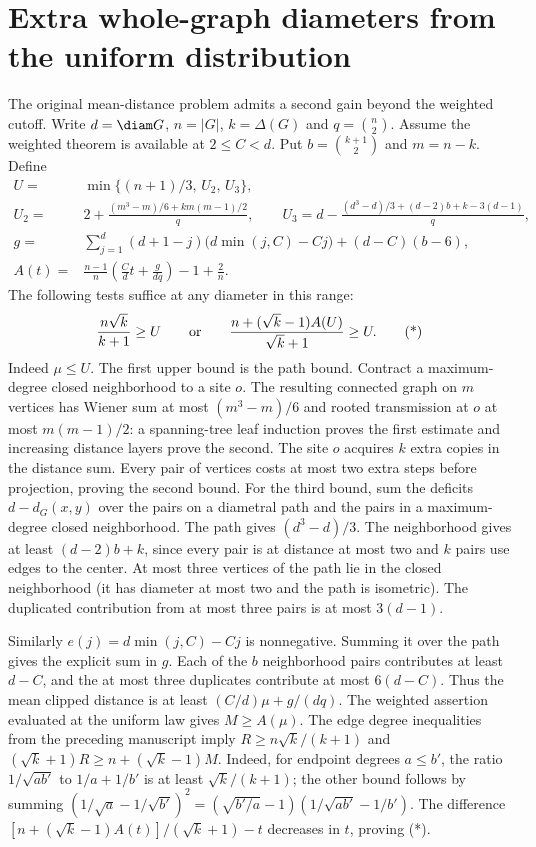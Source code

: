 \documentclass[11pt,a4paper]{article}
\begin{document}
\section{Extra whole-graph diameters from the uniform distribution}
The original mean-distance problem admits a second gain beyond the weighted cutoff. Write $d=\diam G$, $n=|G|$, $k=\Delta(G)$ and $q=\binom n2$. Assume the weighted theorem is available at $2\le C<d$. Put $b=\binom{k+1}{2}$ and $m=n-k$. Define
\begin{align*}
U={}&\min\{(n+1)/3,\, U_2,\, U_3\},\\
U_2={}&
2+\frac{(m^3-m)/6+km(m-1)/2}{q},\qquad U_3=d-\frac{(d^3-d)/3+(d-2)b+k-3(d-1)}{q},\\
g={}&\sum_{j=1}^{d}(d+1-j)\bigl(d\min(j,C)-Cj\bigr)+(d-C)(b-6),\\
A(t)={}&\frac{n-1}{n}\left(\frac Cdt+\frac{g}{dq}\right)-1+\frac2n.
\end{align*}
The following tests suffice at any diameter in this range:
\[
\frac{n\sqrt k}{k+1}\ge U\qquad\hbox{or}\qquad
\frac{n+(\sqrt k-1)A(U)}{\sqrt k+1}\ge U.
\tag{*}
\]
Indeed $\mu\le U$. The first upper bound is the path bound. Contract a maximum-degree closed neighborhood to a site $o$. The resulting connected graph on $m$ vertices has Wiener sum at most $(m^3-m)/6$ and rooted transmission at $o$ at most $m(m-1)/2$: a spanning-tree leaf induction proves the first estimate and increasing distance layers prove the second. The site $o$ acquires $k$ extra copies in the distance sum. Every pair of vertices costs at most two extra steps before projection, proving the second bound. For the third bound, sum the deficits $d-d_G(x,y)$ over the pairs on a diametral path and the pairs in a maximum-degree closed neighborhood. The path gives $(d^3-d)/3$. The neighborhood gives at least $(d-2)b+k$, since every pair is at distance at most two and $k$ pairs use edges to the center. At most three vertices of the path lie in the closed neighborhood (it has diameter at most two and the path is isometric). The duplicated contribution from at most three pairs is at most $3(d-1)$.

Similarly $e(j)=d\min(j,C)-Cj$ is nonnegative. Summing it over the path gives the explicit sum in $g$. Each of the $b$ neighborhood pairs contributes at least $d-C$, and the at most three duplicates contribute at most $6(d-C)$. Thus the mean clipped distance is at least $(C/d)\mu+g/(dq)$. The weighted assertion evaluated at the uniform law gives $M\ge A(\mu)$. The edge degree inequalities from the preceding manuscript imply $R\ge n\sqrt{k}/(k+1)$ and $(\sqrt{k}+1)R\ge n+(\sqrt{k}-1)M$. Indeed, for endpoint degrees $a\le b'$, the ratio $1/\sqrt{ab'}$ to $1/a+1/b'$ is at least $\sqrt{k}/(k+1)$; the other bound follows by summing
$(1/\sqrt a-1/\sqrt{b'})^2=(\sqrt{b'/a}-1)(1/\sqrt{ab'}-1/b')$.
The difference $[n+(\sqrt k-1)A(t)]/(\sqrt k+1)-t$ decreases in $t$, proving (*).
\end{document}
